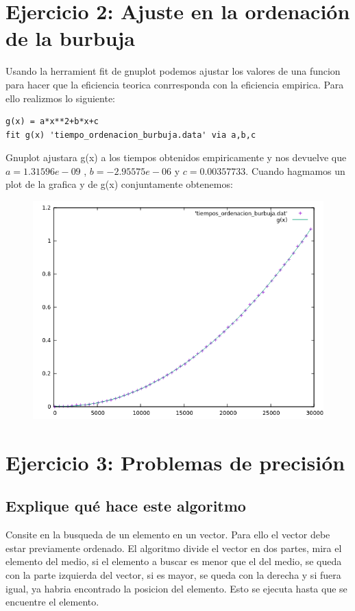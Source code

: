 \documentclass[12pt,a4psprt]{article}
\begin{document}
\section{Ejercicio 2: Ajuste en la ordenación de la burbuja}
Usando la herramient fit de gnuplot podemos ajustar los valores de una funcion para hacer que la eficiencia teorica conrresponda con la eficiencia empirica.
Para ello realizmos lo siguiente:
\begin{verbatim}
g(x) = a*x**2+b*x+c
fit g(x) 'tiempo_ordenacion_burbuja.data' via a,b,c
\end{verbatim}
Gnuplot ajustara g(x) a los tiempos obtenidos empiricamente y nos devuelve que $a=1.31596e-09$ , $b=-2.95575e-06$ y $c=0.00357733$. Cuando hagmamos un plot de la grafica y de g(x) conjuntamente obtenemos:
\begin{figure}[h]
\begin{center}
	\includegraphics[scale=1]{image/grafica_2.png}
\end{center}
\end{figure}
\pagebreak
\section{Ejercicio 3: Problemas de precisión}
\subsection{Explique qué hace este algoritmo}
Consite en la busqueda de un elemento en un vector. Para ello el vector debe estar previamente ordenado.
El algoritmo divide el vector en dos partes, mira el elemento del medio, si el elemento a buscar es menor que el del medio, se queda con la parte izquierda del vector,
si es mayor, se queda con la derecha y si fuera igual, ya habria encontrado la posicion del elemento. Esto se ejecuta hasta que se encuentre el elemento.
\end{document}
